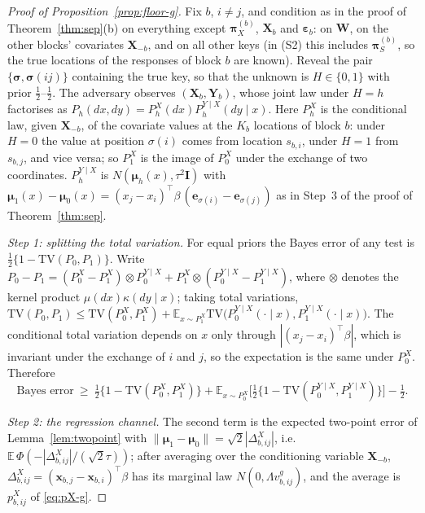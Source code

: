 \documentclass[11pt]{article}
\theoremstyle{definition}
\newcommand{\bX}{\mathbf{X}}
\newcommand{\bx}{\bm{x}}\newcommand{\bg}{\bm{g}}\newcommand{\bw}{\bm{w}}\newcommand{\bz}{\bm{z}}
\newcommand{\bY}{\mathbf{Y}}
\newcommand{\bW}{\mathbf{W}}
\newcommand{\bI}{\mathbf{I}}
\newcommand{\beps}{\boldsymbol{\varepsilon}}
\newcommand{\bmu}{\boldsymbol{\mu}}
\newcommand{\bpi}{\boldsymbol{\pi}}
\newcommand{\bsigma}{\boldsymbol{\sigma}}
\newcommand{\E}{\mathbb{E}}
\begin{document}
\begin{proof}[Proof of Proposition~\ref{prop:floor-g}]
Fix $b$, $i\ne j$, and condition as in the proof of Theorem~\ref{thm:sep}(b) on everything except $\bpi_X^{(b)}$, $\bX_b$ and $\beps_b$: on $\bW$, on the other blocks' covariates $\bX_{-b}$, and on all other keys (in (S2) this includes $\bpi_S^{(b)}$, so the true locations of the responses of block $b$ are known). Reveal the pair $\{\bsigma,\bsigma(ij)\}$ containing the true key, so that the unknown is $H\in\{0,1\}$ with prior $\tfrac12$--$\tfrac12$. The adversary observes $(\bX_b,\bY_b)$, whose joint law under $H=h$ factorises as $P_h(dx,dy)=P_h^X(dx)P_h^{Y\mid X}(dy\mid x)$. Here $P_h^X$ is the conditional law, given $\bX_{-b}$, of the covariate values at the $K_b$ locations of block $b$: under $H=0$ the value at position $\sigma(i)$ comes from location $s_{b,i}$, under $H=1$ from $s_{b,j}$, and vice versa; so $P_1^X$ is the image of $P_0^X$ under the exchange of two coordinates. $P_h^{Y\mid X}$ is $N(\bmu_h(x),\tau^2\bI)$ with $\bmu_1(x)-\bmu_0(x)=(x_j-x_i)^\top\beta\,(\bm e_{\sigma(i)}-\bm e_{\sigma(j)})$ as in Step~3 of the proof of Theorem~\ref{thm:sep}.

\emph{Step 1: splitting the total variation.} For equal priors the Bayes error of any test is $\tfrac12\{1-\mathrm{TV}(P_0,P_1)\}$. Write $P_0-P_1=(P_0^X-P_1^X)\otimes P_0^{Y\mid X}+P_1^X\otimes(P_0^{Y\mid X}-P_1^{Y\mid X})$, where $\otimes$ denotes the kernel product $\mu(dx)\kappa(dy\mid x)$; taking total variations, $\mathrm{TV}(P_0,P_1)\le\mathrm{TV}(P_0^X,P_1^X)+\E_{x\sim P_1^X}\mathrm{TV}\big(P_0^{Y\mid X}(\cdot\mid x),P_1^{Y\mid X}(\cdot\mid x)\big)$. The conditional total variation depends on $x$ only through $|(x_j-x_i)^\top\beta|$, which is invariant under the exchange of $i$ and $j$, so the expectation is the same under $P_0^X$. Therefore
\[
\text{Bayes error}\ \ge\ \tfrac12\{1-\mathrm{TV}(P_0^X,P_1^X)\}+\E_{x\sim P_0^X}\big[\tfrac12\{1-\mathrm{TV}(P_0^{Y\mid X},P_1^{Y\mid X})\}\big]-\tfrac12 .
\]

\emph{Step 2: the regression channel.} The second term is the expected two-point error of Lemma~\ref{lem:twopoint} with $\|\bmu_1-\bmu_0\|=\sqrt2|\Delta^X_{b,ij}|$, i.e.\ $\E\,\Phi(-|\Delta^X_{b,ij}|/(\sqrt2\tau))$; after averaging over the conditioning variable $\bX_{-b}$, $\Delta^X_{b,ij}=(\bx_{b,j}-\bx_{b,i})^\top\beta$ has its marginal law $N(0,\Lambda v^g_{b,ij})$, and the average is $p^X_{b,ij}$ of \eqref{eq:pX-g}.


\end{proof}
\end{document}
